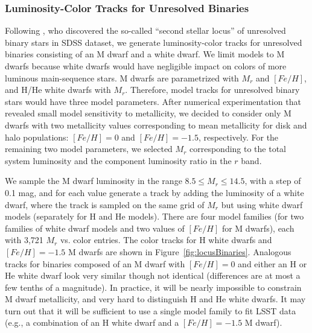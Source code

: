 \subsubsection{Luminosity-Color Tracks for Unresolved Binaries}

Following \cite{2004ApJ...615L.141S}, who discovered the so-called ``second stellar locus'' of unresolved binary
stars in SDSS dataset, we generate luminosity-color tracks for unresolved binaries consisting of an M dwarf and a white dwarf.
We limit models to M dwarfs because white dwarfs would have negligible impact on colors of more luminous main-sequence stars. 
M dwarfs are parametrized with $M_r$ and $[Fe/H]$, and H/He white dwarfs with $M_r$. Therefore, model tracks for unresolved binary
stars would have three model parameters. After numerical experimentation that revealed small model sensitivity to metallicity, we
decided to consider only M dwarfs with two metallicity values corresponding to mean metallicity for disk and halo populations:
$[Fe/H]=0$ and $[Fe/H]=-1.5$, respectively. For the remaining two model parameters, we selected $M_r$ corresponding to the
total system luminosity and the component luminosity ratio in the $r$ band. 

We sample the M dwarf luminosity in the range $8.5 \le M_r \le 14.5$, with a step of 0.1 mag, and for each value
generate a track by adding the luminosity of a white dwarf, where the track is sampled on the same grid of $M_r$ but
using white dwarf models (separately for H and He models). There are four model families (for two families of white dwarf
models and two values of $[Fe/H]$ for M dwarfs), each with 3,721 $M_r$ vs. color entries. The color tracks for H white dwarfs
and $[Fe/H]=-1.5$ M dwarfs are shown in Figure~\ref{fig:locusBinaries}. Analogous tracks for binaries composed of an M dwarf with
$[Fe/H]=0$ and either an H or He white dwarf look very similar though not identical (differences are at most a few tenths
of a magnitude). In practice, it will be nearly impossible to constrain M dwarf metallicity, and very hard to distinguish
H and He white dwarfs. It may turn out that it will be sufficient to use a single model family to fit LSST data (e.g., a
combination of an H white dwarf and a $[Fe/H]=-1.5$ M dwarf). 



